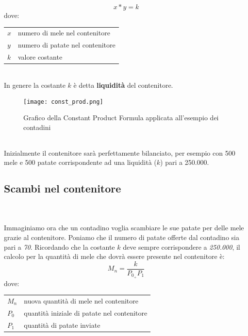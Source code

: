 \documentclass[12pt,a4paper]{report}
\makeatletter
\newenvironment{conditions}
  {\par\vspace{\abovedisplayskip}\noindent\begin{tabular}{>{$}l<{$} @{${}={}$} l}}
  {\end{tabular}\par\vspace{\belowdisplayskip}}
\makeatother
\begin{document}
\begin{equation}
x * y = k
\label{eqn:const_prod_f}
\end{equation}
dove:
\begin{conditions}
 x & numero di mele nel contenitore \\
 y & numero di patate nel contenitore \\  
 k & valore costante \\
\end{conditions}

\noindent \\In genere la costante $k$ è detta \textbf{liquidità} del contenitore.

\begin{figure}[H]
  \texttt{[image: const\_prod.png]}
  \centering
  \caption{Grafico della Constant Product Formula applicata all'esempio dei contadini}
  \label{fig:const_prod}
\end{figure}

\noindent\\Inizialmente il contenitore sarà perfettamente bilanciato, per esempio con 500 mele e 500 patate corrispondente ad una liquidità ($k$) pari a 250.000.

\subsection{Scambi nel contenitore}

\\\\Immaginiamo ora che un contadino voglia scambiare le sue patate per delle mele grazie al contenitore.
Poniamo che il numero di patate offerte dal contadino sia pari a \textit{70}.
Ricordando che la costante $k$ deve sempre corrispondere a \textit{250.000}, il calcolo per la quantità di mele che dovrà essere presente nel contenitore è:\\


\begin{equation}
M_{n} = \frac{k}{P_{0}_ + P_{1}}
\label{eqn:nuove_mele}
\end{equation}
dove:
\begin{conditions}
 M_{n} & nuova quantità di mele nel contenitore \\
 P_{0} & quantità iniziale di patate nel contenitore \\  
 P_{1} & quantità di patate inviate
\end{conditions}
\end{document}
